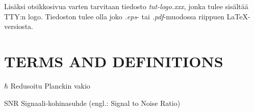 Lisäksi otsikkosivua varten tarvitaan tiedosto \textit{tut-logo.xxx}, jonka
tulee sisältää TTY:n logo. Tiedoston tulee
olla joko \textit{.eps}- tai \textit{.pdf}-muodossa riippuen \LaTeX-versiosta.
 
\newpage
\tableofcontents
\newpage
\chapter*{TERMS AND DEFINITIONS}
 
 
\begin{termiluettelo}
 
\item [$\hbar$] Redusoitu Planckin vakio
\item [SNR] Signaali-kohinasuhde (engl.: Signal to Noise Ratio)
 
\end{termiluettelo} 
 
 
\newpage
\renewcommand{\chaptermark}[1]{\markboth{\thechapter. \ #1}{}}
\renewcommand{\sectionmark}[1]{\markright{}{}}
\lhead{\fancyplain{}{\leftmark}}
 
